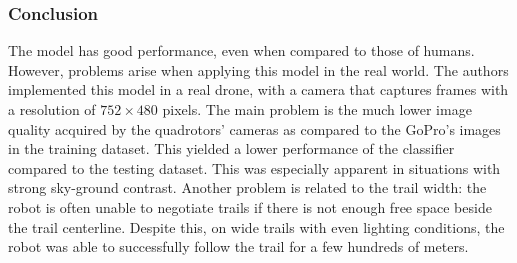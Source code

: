 \subsubsection{Conclusion}\label{header-n191}

The model has good performance, even when compared to those of humans.
However, problems arise when applying this model in the real world. The
authors implemented this model in a real drone, with a camera that
captures frames with a resolution of $752 \times 480$ pixels. The main problem
is the much lower image quality acquired by the quadrotors' cameras as
compared to the GoPro's images in the training dataset. This yielded a
lower performance of the classifier compared to the testing dataset.
This was especially apparent in situations with strong sky-ground
contrast. Another problem is related to the trail width: the robot is
often unable to negotiate trails if there is not enough free space
beside the trail centerline. Despite this, on wide trails with even
lighting conditions, the robot was able to successfully follow the trail
for a few hundreds of meters.